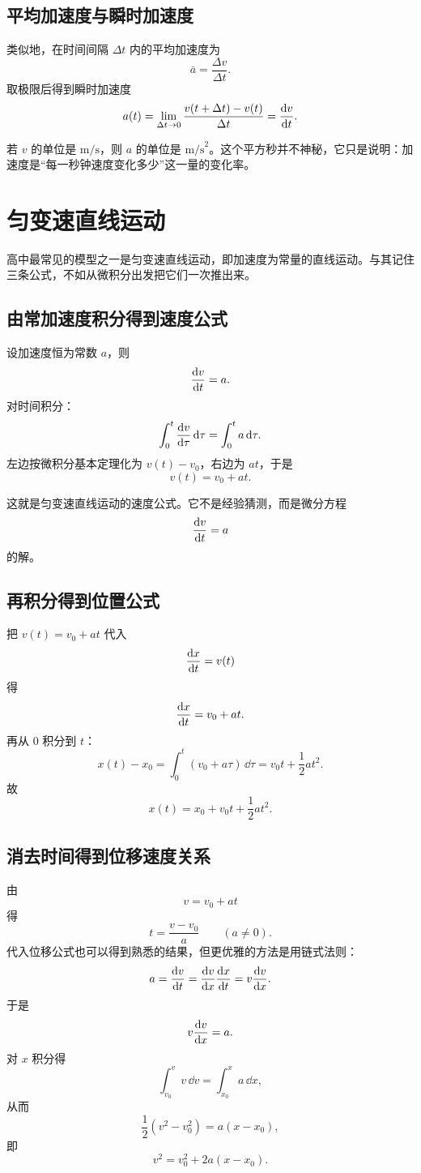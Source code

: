 \subsection{平均加速度与瞬时加速度}

类似地，在时间间隔 $\Delta t$ 内的平均加速度为
\[
\bar a=\frac{\Delta v}{\Delta t}.
\]
取极限后得到瞬时加速度
\[
 a(t)=\lim_{\Delta t\to 0}\frac{v(t+\Delta t)-v(t)}{\Delta t}=\dv{v}{t}.
\]

\begin{remark}
若 $v$ 的单位是 $\text{m/s}$，则 $a$ 的单位是 $\text{m/s}^2$。这个平方秒并不神秘，它只是说明：加速度是``每一秒钟速度变化多少''这一量的变化率。
\end{remark}

\section{匀变速直线运动}

高中最常见的模型之一是匀变速直线运动，即加速度为常量的直线运动。与其记住三条公式，不如从微积分出发把它们一次推出来。

\subsection{由常加速度积分得到速度公式}

设加速度恒为常数 $a$，则
\[
\dv{v}{t}=a.
\]
对时间积分：
\[
\int_{0}^{t} \dv{v}{\tau}\,\dd \tau=\int_0^t a\,\dd \tau.
\]
左边按微积分基本定理化为 $v(t)-v_0$，右边为 $at$，于是
\[
 v(t)=v_0+at.
\]

这就是匀变速直线运动的速度公式。它不是经验猜测，而是微分方程
\[
\dv{v}{t}=a
\]
的解。

\subsection{再积分得到位置公式}

把 $v(t)=v_0+at$ 代入
\[
\dv{x}{t}=v(t)
\]
得
\[
\dv{x}{t}=v_0+at.
\]
再从 $0$ 积分到 $t$：
\[
 x(t)-x_0=\int_0^t (v_0+a\tau)\,\dd \tau=v_0 t+\frac12 at^2.
\]
故
\[
 x(t)=x_0+v_0 t+\frac12 at^2.
\]

\subsection{消去时间得到位移速度关系}

由
\[
 v=v_0+at
\]
得
\[
 t=\frac{v-v_0}{a}\qquad (a\neq 0).
\]
代入位移公式也可以得到熟悉的结果，但更优雅的方法是用链式法则：
\[
 a=\dv{v}{t}=\dv{v}{x}\dv{x}{t}=v\dv{v}{x}.
\]
于是
\[
 v\dv{v}{x}=a.
\]
对 $x$ 积分得
\[
 \int_{v_0}^{v} v\,\dd v=\int_{x_0}^{x} a\,\dd x,
\]
从而
\[
 \frac12 (v^2-v_0^2)=a(x-x_0),
\]
即
\[
 v^2=v_0^2+2a(x-x_0).
\]

